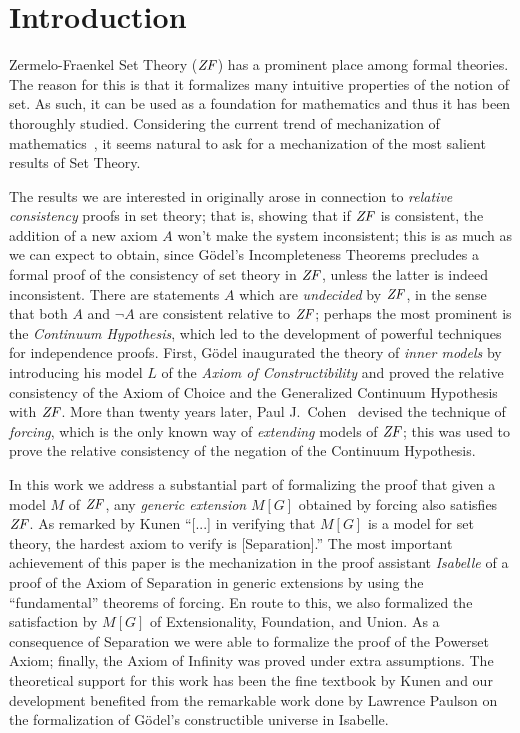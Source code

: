 \section{Introduction}
Zermelo-Fraenkel Set Theory ($\mathit{ZF}$) has a prominent place among formal
theories. The reason for this is that it formalizes many intuitive
properties of the notion of set. As such, it can be used as a
foundation for mathematics and thus it has been
thoroughly studied. 
Considering the current trend 
of mechanization of mathematics~\cite{avigad2018mechanization}, it
seems natural to ask for a mechanization of the most salient results
of Set Theory.

The results we are interested in originally arose in connection to
\emph{relative consistency} proofs in set theory; that is, showing
that if $\mathit{ZF}$ is 
consistent, the addition of a new axiom $A$ won't make the system
inconsistent; this is as much as we can expect to obtain, since
G\"odel's Incompleteness Theorems precludes a  
formal proof of the consistency of set theory in $\mathit{ZF}$, unless the
latter is indeed inconsistent. There are statements $A$ which are
\emph{undecided} by $\mathit{ZF}$, in the sense that both $A$ and $\neg A$ are
consistent relative to $\mathit{ZF}$; perhaps the most prominent  is the
\emph{Continuum Hypothesis}, which led to the development of powerful
techniques for independence proofs. First, G\"odel inaugurated the
theory of \emph{inner models} by introducing his model $L$ of
the \emph{Axiom of Constructibility} \cite{godel-L} and proved the
relative consistency of the Axiom of Choice and the Generalized
Continuum Hypothesis with $\mathit{ZF}$. More than twenty years later, Paul
J.~Cohen~\cite{Cohen-CH-PNAS} devised the technique of \emph{forcing},
which is the only known way of \emph{extending} models of $\mathit{ZF}$; this
was used to prove the relative consistency of the 
negation of the Continuum Hypothesis. 

In this work we address a substantial part of formalizing the proof
that given a model $M$ of $\mathit{ZF}$, any \emph{generic extension} $M[G]$
obtained by forcing also satisfies $\mathit{ZF}$. As remarked by Kunen
\cite[p.250]{kunen2011set} \enquote{[...] in verifying that $M[G]$ is
  a model for set theory, the hardest axiom to verify is
  [Separation].}  The most important achievement of this paper is the
mechanization in the proof assistant \emph{Isabelle} of a proof of the
Axiom of Separation in generic extensions by using the ``fundamental''
theorems of forcing.  En route to this, we also formalized the
satisfaction by $M[G]$ of Extensionality, Foundation, and Union. As a
consequence of Separation we were able to formalize the proof of the
Powerset Axiom; finally, the Axiom of Infinity was proved under extra
assumptions. %
The theoretical support for this work has been 
the fine textbook by Kunen \cite{kunen2011set} and our development
benefited from the remarkable work done by Lawrence 
Paulson \cite{paulson_2003} on the formalization of G\"odel's
constructible universe in Isabelle. 

